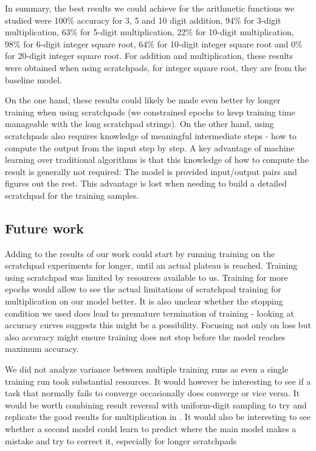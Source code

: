 In summary, the best results we could achieve for the arithmetic functions we studied were 100\% accuracy for 3, 5 and 10 digit addition, 94\% for 3-digit multiplication, 63\% for 5-digit multiplication, 22\% for 10-digit multiplication, 98\% for 6-digit integer square root, 64\% for 10-digit integer square root and 0\% for 20-digit integer square root.
For addition and multiplication, these results were obtained when using scratchpads, for integer square root, they are from the baseline model.

On the one hand, these results could likely be made even better by longer training when using scratchpads (we constrained epochs to keep training time manageable with the long scratchpad strings).
On the other hand, using scratchpads also requires knowledge of meaningful intermediate steps - how to compute the output from the input step by step. A key advantage of machine learning over traditional algorithms is that this knowledge of how to compute the result is generally not required: The model is provided input/output pairs and figures out the rest. This advantage is lost when needing to build a detailed scratchpad for the training samples.



\subsection{Future work}

Adding to the results of our work could start by running training on the scratchpad experiments for longer, until an actual plateau is reached. Training using scratchpad was limited by resources available to us. Training for more epochs would allow to see the actual limitations of scratchpad training for multiplication on our model better.
It is also unclear whether the stopping condition we used does lead to premature termination of training - looking at accuracy curves suggests this might be a possibility. Focusing not only on loss but also accuracy might ensure training does not stop before the model reaches maximum accuracy.

We did not analyze variance between multiple training runs as even a single training run took substantial resources. It would however be interesting to see if a task that normally fails to converge occasionally does converge or vice versa.
It would be worth combining result reversal with uniform-digit sampling to try and replicate the good results for multiplication in \cite{positionmatters}.
It would also be interesting to see whether a second model could learn to predict where the main model makes a mistake and try to correct it, especially for longer scratchpads

